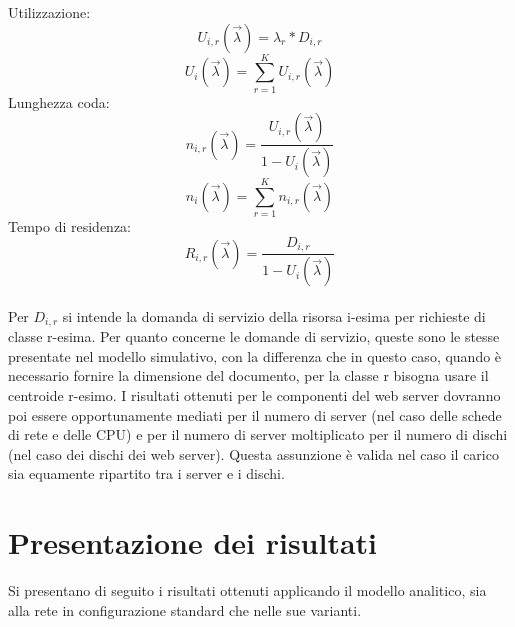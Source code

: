 Utilizzazione:
\begin{equation}
U_{i,r}(\overrightarrow{\lambda}) = \lambda_{r} * D_{i,r}
\end{equation}
\begin{equation}
U_{i}(\overrightarrow{\lambda})  = \sum_{r=1}^{K} U_{i,r}(\overrightarrow{\lambda})
\end{equation}
Lunghezza coda:
\begin{equation}
n_{i,r}(\overrightarrow{\lambda}) = \frac{U_{i,r}(\overrightarrow{\lambda})}{1 - U_{i}(\overrightarrow{\lambda})}
\end{equation}
\begin{equation}
n_{i}(\overrightarrow{\lambda}) = \sum_{r=1}^{K} n_{i,r}(\overrightarrow{\lambda})
\end{equation}
Tempo di residenza:
\begin{equation}
R_{i,r}(\overrightarrow{\lambda}) = \frac{D_{i,r}}{1 - U_{i}(\overrightarrow{\lambda})}
\end{equation}\\
Per $D_{i,r}$ si intende la domanda di servizio della risorsa i-esima per richieste di classe r-esima. Per quanto concerne le domande di servizio, queste sono le stesse presentate nel modello simulativo, con la differenza che in questo caso, quando è necessario fornire la dimensione del documento, per la classe r bisogna usare il centroide r-esimo. I risultati ottenuti per le componenti del web server dovranno poi essere opportunamente mediati per il numero di server (nel caso delle schede di rete e delle CPU) e per il numero di server moltiplicato per il numero di dischi (nel caso dei dischi dei web server). Questa assunzione è valida nel caso il carico sia equamente ripartito tra i server e i dischi.
\section{Presentazione dei risultati}
Si presentano di seguito i risultati ottenuti applicando il modello analitico, sia alla rete in configurazione standard che nelle sue varianti.
